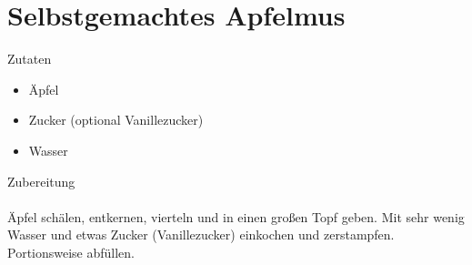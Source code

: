 \section*{Selbstgemachtes Apfelmus}
\ihead{}\ohead{}
\cfoot{}
{\Large Zutaten}
\begin{itemize}
    \item Äpfel
    \item Zucker (optional Vanillezucker)
    \item Wasser
\end{itemize}
\noindent
{\Large Zubereitung}\\
\\
Äpfel schälen, entkernen, vierteln und in einen großen Topf geben.
Mit sehr wenig Wasser und etwas Zucker (Vanillezucker) einkochen und zerstampfen.
Portionsweise abfüllen.
